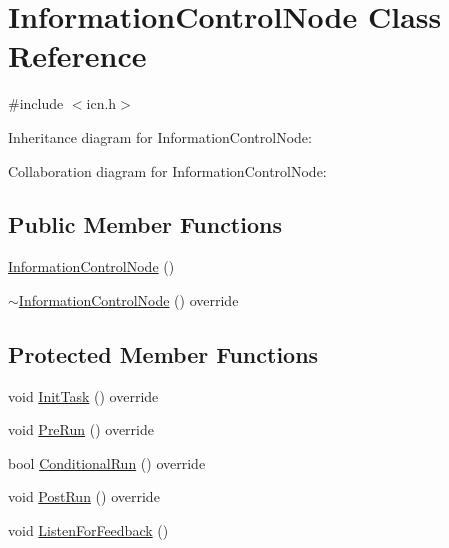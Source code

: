 \hypertarget{classInformationControlNode}{}\section{Information\+Control\+Node Class Reference}
\label{classInformationControlNode}


{\ttfamily \#include $<$icn.\+h$>$}



Inheritance diagram for Information\+Control\+Node\+:


Collaboration diagram for Information\+Control\+Node\+:
\subsection*{Public Member Functions}
\begin{DoxyCompactItemize}
\item 
\hyperlink{classInformationControlNode_a9baee017a043808500bb4b13cde14472}{Information\+Control\+Node} ()
\item 
\hyperlink{classInformationControlNode_a597ea5196bf130a73c7afe958364201d}{$\sim$\+Information\+Control\+Node} () override
\end{DoxyCompactItemize}
\subsection*{Protected Member Functions}
\begin{DoxyCompactItemize}
\item 
void \hyperlink{classInformationControlNode_a313aa7628f53aa32f60f51f26826f6a6}{Init\+Task} () override
\item 
void \hyperlink{classInformationControlNode_aa19d217255dd46922af70a16ca66566a}{Pre\+Run} () override
\item 
bool \hyperlink{classInformationControlNode_aa65776fa48fbef797e31ee7dcb7aecdf}{Conditional\+Run} () override
\item 
void \hyperlink{classInformationControlNode_a061eb8c36732ffb5444cdaae521d5f99}{Post\+Run} () override
\item 
void \hyperlink{classInformationControlNode_a8ebd8b353095ef210ae45c972bbc0153}{Listen\+For\+Feedback} ()
\end{DoxyCompactItemize}

